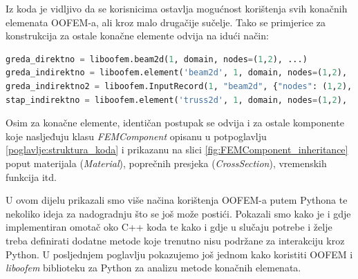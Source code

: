 \documentclass[a4paper,twoside,12pt]{memoir} %
\begin{document}
Iz koda je vidljivo da se korisnicima ostavlja mogućnost korištenja svih konačnih elemenata OOFEM-a, ali kroz malo drugačije sučelje. Tako se primjerice za konstrukcija za ostale konačne elemente odvija na idući način:

\begin{lstlisting}[language=python, caption={Primjer konstrukcije konačnih elemenata koji nemaju implementiran direktan poziv}]
greda_direktno = liboofem.beam2d(1, domain, nodes=(1,2), ...)
greda_indirektno = liboofem.element('beam2d', 1, domain, nodes=(1,2), ...)
greda_indirektno2 = liboofem.InputRecord(1, "beam2d", {"nodes": (1,2), ...})
stap_indirektno = liboofem.element('truss2d', 1, domain, nodes=(1,2), ...)
\end{lstlisting}

Osim za konačne elemente, identičan postupak se odvija i za ostale komponente koje nasljeđuju klasu \textit{FEMComponent} opisanu u potpoglavlju \ref{poglavlje:struktura_koda} i prikazanu na slici \ref{fig:FEMComponent_inheritance} poput materijala (\textit{Material}), poprečnih presjeka (\textit{CrossSection}), vremenskih funkcija itd. \par

U ovom dijelu prikazali smo više načina korištenja OOFEM-a putem Pythona te nekoliko ideja za nadogradnju što se još može postići. Pokazali smo kako je i gdje implementiran omotač oko C++ koda te kako i gdje u slučaju potrebe i želje treba definirati dodatne metode koje trenutno nisu podržane za interakciju kroz Python. U posljednjem poglavlju pokazujemo još jednom kako koristiti OOFEM i \textit{liboofem} biblioteku za Python za analizu metode konačnih elemenata.
\end{document}
